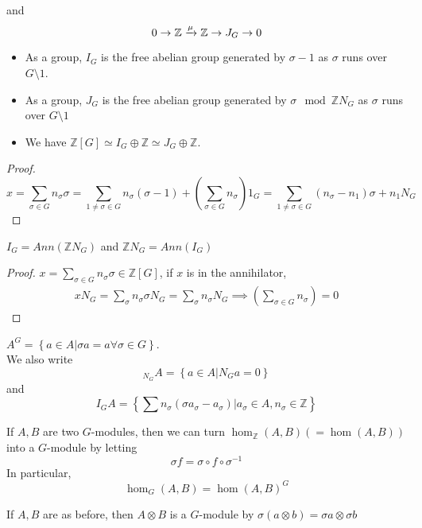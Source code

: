 \documentclass[../main.tex]{subfiles}
\begin{document}
and
\[ 
0 \to \mathbb{Z}\xrightarrow{\mu} \mathbb{Z} \to J_G\to 0
\]
\begin{lemma}
\begin{itemize}
\item As a group, $I_G$ is the free abelian group generated by $\sigma- 1$ as $\sigma$ runs over $G\setminus 1$.
\item As a group, $J_G$ is the free abelian group generated by $\sigma \mod \mathbb{Z}N_G$ as $\sigma$ runs over $G\setminus 1$ 
\item We have $\mathbb{Z}[G] \simeq I_G \oplus \mathbb{Z}\simeq J_G \oplus \mathbb{Z}$.
\end{itemize}
\end{lemma}
\begin{proof}
	\[ 
	x= \sum_{\sigma \in G} n_{\sigma} \sigma = \sum_{1\neq \sigma\in G} n_{\sigma} ( \sigma-1) + ( \sum_{\sigma \in G} n_\sigma) 1_G = \sum_{1\neq \sigma\in G} ( n_\sigma- n_1) \sigma + n_1 N_G
	\]
\end{proof}
\begin{lemma}
$I_G= Ann( \mathbb{Z}N_G) $ and $ \mathbb{Z}N_G= Ann( I_G) $ 
\end{lemma}
\begin{proof}
	$x= \sum_{\sigma \in G} n_\sigma \sigma\in \mathbb{Z}[G]$, if $x$ is in the annihilator,
	\begin{align*}
		xN_G = \sum_{\sigma} n_\sigma \sigma N_G = \sum_{\sigma} n_\sigma N_G \implies ( \sum_{\sigma \in G} n_\sigma) =0
	\end{align*}
\end{proof}
\begin{defn}
	$A^{G}= \left\{ a\in A|\sigma a = a \forall \sigma \in G \right\}  $.\\
	We also write
	\[ 
	{ } _{N_G} A = \left\{ a\in A |N_G a = 0 \right\} 
	\]
	and 
	\[ 
	I_G A = \left\{ \sum n_\sigma( \sigma a_\sigma - a_\sigma) |a_\sigma \in A, n_\sigma \in \mathbb{Z} \right\} 
	\]
\end{defn}
\begin{defn}
	If $A,B$ are two $G$-modules, then we can turn $\hom_{\mathbb{Z}} ( A,B) ( = \hom( A,B) ) $ into a $G$-module by letting
	\[ 
	\sigma f = \sigma\circ f \circ \sigma^{-1}
	\]
In particular,
\[ 
\hom_G( A,B) = \hom( A,B)^{G}
\]
\end{defn}
\begin{defn}
	If $A,B$ are as before, then $A\otimes B$ is a $G$-module by $\sigma( a\otimes b) = \sigma a \otimes \sigma b$
\end{defn}
\end{document}
